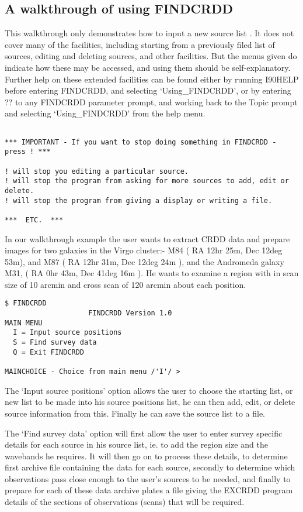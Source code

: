 \documentclass[twoside,11pt]{article}
\begin{document}
\subsection{A walkthrough of using FINDCRDD}
This walkthrough only demonstrates how to input a new source list . It does 
not cover many of the facilities, including starting from a previously filed
list of sources, editing and deleting sources, and other facilities. But
the menus given do indicate how these may be accessed, and using them should
be self-explanatory. Further help on these extended facilities can be found
either by running I90HELP before entering FINDCRDD, and selecting
`Using\_FINDCRDD', or by entering ?? to any FINDCRDD parameter prompt, and
working back to the Topic prompt and selecting `Using\_FINDCRDD' from the
help menu.
\begin{verbatim}

*** IMPORTANT - If you want to stop doing something in FINDCRDD - press ! ***

! will stop you editing a particular source.
! will stop the program from asking for more sources to add, edit or delete.
! will stop the program from giving a display or writing a file.

***  ETC.  ***
\end{verbatim}
In our walkthrough example the user wants to extract CRDD data and prepare
images for two galaxies in the Virgo cluster:- M84 ( RA 12hr 25m,
Dec 12deg 53m), and M87 ( RA 12hr 31m, Dec 12deg 24m ), and the Andromeda
galaxy M31, ( RA 0hr 43m, Dec 41deg 16m ). He wants to examine a region with
in scan size of 10 arcmin and cross scan of 120 arcmin about each position.

\begin{verbatim}
$ FINDCRDD
                    FINDCRDD Version 1.0
MAIN MENU
  I = Input source positions
  S = Find survey data
  Q = Exit FINDCRDD

MAINCHOICE - Choice from main menu /'I'/ > 
\end{verbatim}

The `Input source positions' option allows the user to choose the starting
list, or new list to be made into his source positions list, he can then
add, edit, or delete source information from this. Finally he can save the
source list to a file.

The `Find survey data' option will first allow the user to enter survey
specific details for each source in his source list, ie. to add the region
size and the wavebands he requires. It will then go on to process these
details, to determine first archive file containing the data for each source,
secondly to determine which observations pass close enough to the user's
sources to be needed, and finally to prepare for each of these data
archive plates a file giving the EXCRDD program details of the sections of
observations (scans) that will be required.
\end{document}
